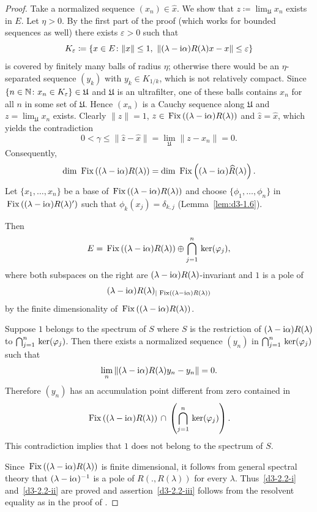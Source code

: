 \begin{proof}
Take a normalized sequence $(x_{n}) \in \hat{x}$.
We show that $z \coloneq \lim_{\mathfrak{U}} x_{n}$ exists in $E$.
Let $\eta > 0$.
By the first part of the proof (which works for bounded sequences as well) there exists $\varepsilon > 0$ such that
\[
K_{\varepsilon} \coloneq \{x \in E \colon \|x\| \leq 1,\ \|(\lambda - \im\alpha)R(\lambda)x - x\| \leq \varepsilon\}
\]
is covered by finitely many balls of radius $\eta$;
otherwise there would be an $\eta$-separated sequence $(y_{k})$ with $y_{k} \in K_{1/k}$, which is not relatively compact.
Since $\{n \in \mathbb{N} \colon x_{n} \in K_{\varepsilon}\} \in \mathfrak{U}$ and $\mathfrak{U}$ is an ultrafilter,
one of these balls contains $x_{n}$ for all $n$ in some set of\/ $\mathfrak{U}$.
Hence $(x_{n})$ is a Cauchy sequence along $\mathfrak{U}$ and $z = \lim_{\mathfrak{U}} x_{n}$ exists.
Clearly $\|z\| = 1$, $z \in \mathop{}\mathrm{Fix}\left((\lambda - \mathrm{i}\alpha)R(\lambda)\right)$ and $\hat{z} = \hat{x}$,
which yields the contradiction
\[
 0 < \gamma \leq \|\hat{z} - \hat{x}\| = \lim_{\mathfrak{U}} \|z - x_{n}\| = 0 .
\]
Consequently,
\[
\mathop{}\!\mathrm{dim}\, \mathop{}\mathrm{Fix}\left((\lambda - \mathrm{i}\alpha)R(\lambda)\right) = \mathop{}\!\mathrm{dim}\, \mathop{}\mathrm{Fix}\left((\lambda - \mathrm{i}\alpha)\widehat{R}(\lambda)\right).
\]
Let $\{x_{1},\dots,x_{n}\}$ be a base of 
$\mathop{}\mathrm{Fix}\left((\lambda - \mathrm{i}\alpha)R(\lambda)\right)$ and choose $\{\phi_{1},\dots,\phi_{n}\}$ in 
$\mathop{}\mathrm{Fix}\left((\lambda - \mathrm{i}\alpha)R(\lambda)'\right)$ such that $\phi_{k}(x_{j}) = \delta_{k,j}$ 
(Lemma~\ref{lem:d3-1.6}).

Then
\[
E = \Fix{(\lambda - \im\alpha)R(\lambda)} \oplus \bigcap_{j=1}^{n} \Kern{\phi_{j}},
\]
where both subspaces on the right are 
$(\lambda - \mathrm{i}\alpha)R(\lambda)$-invariant and $1$ is a pole of 
\[
(\lambda-\mathrm{i}\alpha)R(\lambda)_{\vert \mathop{}\mathrm{Fix}\left( (\lambda-\mathrm{i}\alpha) R(\lambda)\right)}
\]
by the finite dimensionality of\/ $\mathop{}\mathrm{Fix}\left((\lambda - \mathrm{i}\alpha)R(\lambda)\right)$.

Suppose $1$ belongs to the spectrum of\/ $S$ where $S$ is the restriction of 
$(\lambda-\mathrm{i}\alpha)R(\lambda)$ to $\bigcap_{j=1}^{n} \Kern{\phi_{j}}$.
Then there exists a normalized sequence $(y_{n})$ in 
$\bigcap_{j=1}^{n} \Kern{\phi_{j}}$ such that
\[
\lim_{n} \|(\lambda - \mathrm{i}\alpha)R(\lambda)y_{n} - y_{n}\| = 0 .
\]
Therefore $(y_{n})$ has an accumulation point different from zero contained in
\[
\Fix{(\lambda - \im\alpha)R(\lambda)} \, \cap \,\left( \bigcap_{j=1}^{n} \Kern{\phi_{j}} \right) .
\]
This contradiction implies that $1$ does not belong to the spectrum of\/ $S$.

Since $\mathop{}\mathrm{Fix}\left((\lambda - \mathrm{i}\alpha)R(\lambda)\right)$ is finite dimensional, it follows from general spectral theory that $(\lambda - \mathrm{i}\alpha)^{-1}$ is a pole of\/ $R(.,R(\lambda))$ for every $\lambda$.
Thus~\ref{d3-2.2-i} and~\ref{d3-2.2-ii} are proved and assertion~\ref{d3-2.2-iii} follows from the resolvent equality as in the proof of \textcite[Proposition 1.2]{greiner:1981}.
\end{proof}
